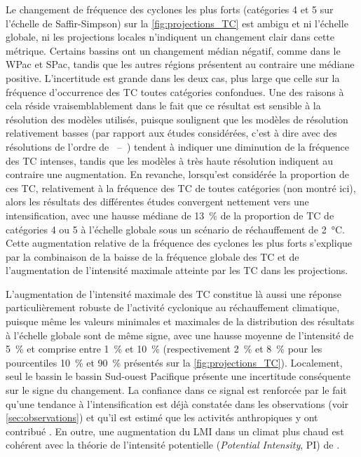 \documentclass[../main.tex]{subfiles}
\begin{document}
Le changement de fréquence des cyclones les plus forts (catégories 4 et 5 sur l'échelle de Saffir-Simpson) sur la \cref{fig:projections_TC} est ambigu et ni
l'échelle globale, ni les projections locales n'indiquent un changement clair dans cette métrique. Certains bassins ont un changement médian négatif, comme dans
le WPac et SPac, tandis que les autres régions présentent au contraire une médiane positive. L'incertitude est grande dans les deux cas, plus large que celle
sur la fréquence d'occurrence des TC toutes catégories confondues. Une des raisons  à cela réside vraisemblablement dans le fait que ce résultat est sensible à
la résolution des modèles utilisés, puisque \cite{knutson_tropical_2020} soulignent que les modèles de résolution relativement basses (par rapport aux études
considérées, c'est à dire avec des résolutions de l'ordre de ~--~) tendent à indiquer une diminution de la fréquence des TC intenses, tandis que
les modèles à très haute résolution indiquent au contraire une augmentation. En revanche, lorsqu'est considérée la proportion de ces TC, relativement à la
fréquence des TC de toutes catégories (non montré ici), alors les résultats des différentes études convergent nettement vers une intensification, avec une
hausse médiane de \SI{13}{\percent} de la proportion de TC de catégories 4 ou 5 à l'échelle globale sous un scénario de réchauffement de \SI{2}{\degreeCelsius}.
Cette augmentation relative de la fréquence des cyclones les plus forts s'explique par la combinaison de la baisse de la fréquence globale des TC et de
l'augmentation de l'intensité maximale atteinte par les TC dans les projections.

L'augmentation de l'intensité maximale des TC constitue là aussi une réponse particulièrement robuste de l'activité cyclonique au réchauffement climatique,
puisque même les valeurs minimales et maximales de la distribution des résultats à l'échelle globale sont de même signe, avec une hausse moyenne de l'intensité
de \SI{5}{\percent} et comprise entre \SI{1}{\percent} et \SI{10}{\percent} (respectivement \SI{2}{\percent} et \SI{8}{\percent} pour les pourcentiles
\SI{10}{\percent} et \SI{90}{\percent} présentés sur la \cref{fig:projections_TC}). Localement, seul le bassin le bassin Sud-ouest Pacifique présente une
incertitude conséquente sur le signe du changement. La confiance dans ce signal est renforcée par le fait qu'une tendance à l'intensification est déjà constatée
dans les observations (voir \cref{sec:observations}) et qu'il est estimé que les activités anthropiques y ont contribué \parencite{knutson_tropical_2019}. En
outre, une augmentation du LMI dans un climat plus chaud est cohérent avec la théorie de l'intensité potentielle (\textit{Potential Intensity}, PI) de
\cite{emanuel_dependence_1987}.
\end{document}
